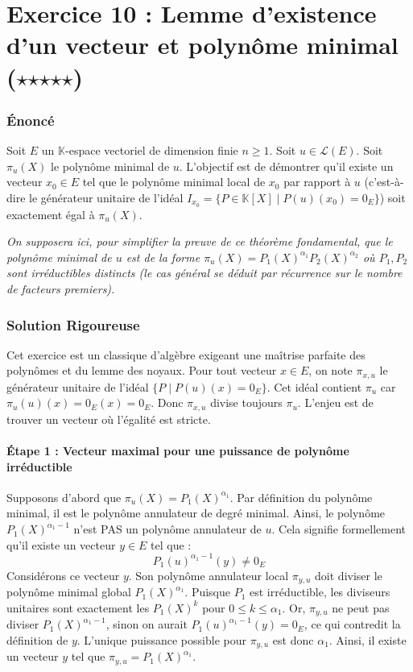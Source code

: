 \documentclass[11pt,a4paper]{article}
\begin{document}
\part{Exercice 10 : Lemme d'existence d'un vecteur et polynôme minimal ($\star$$\star$$\star$$\star$$\star$)}

\section{Énoncé}

Soit $E$ un $\mathbb{K}$-espace vectoriel de dimension finie $n \ge 1$. Soit $u \in \mathcal{L}(E)$.
Soit $\pi_u(X)$ le polynôme minimal de $u$.
L'objectif est de démontrer qu'il existe un vecteur $x_0 \in E$ tel que le polynôme minimal local de $x_0$ par rapport à $u$ (c'est-à-dire le générateur unitaire de l'idéal $I_{x_0} = \{ P \in \mathbb{K}[X] \mid P(u)(x_0) = 0_E \}$) soit exactement égal à $\pi_u(X)$.

\textit{On supposera ici, pour simplifier la preuve de ce théorème fondamental, que le polynôme minimal de $u$ est de la forme $\pi_u(X) = P_1(X)^{\alpha_1} P_2(X)^{\alpha_2}$ où $P_1, P_2$ sont irréductibles distincts (le cas général se déduit par récurrence sur le nombre de facteurs premiers).}

\section{Solution Rigoureuse}

Cet exercice est un classique d'algèbre exigeant une maîtrise parfaite des polynômes et du lemme des noyaux.
Pour tout vecteur $x \in E$, on note $\pi_{x, u}$ le générateur unitaire de l'idéal $\{ P \mid P(u)(x) = 0_E \}$. Cet idéal contient $\pi_u$ car $\pi_u(u)(x) = 0_E(x) = 0_E$. Donc $\pi_{x, u}$ divise toujours $\pi_u$. L'enjeu est de trouver un vecteur où l'égalité est stricte.

\subsection{Étape 1 : Vecteur maximal pour une puissance de polynôme irréductible}
Supposons d'abord que $\pi_u(X) = P_1(X)^{\alpha_1}$.
Par définition du polynôme minimal, il est le polynôme annulateur de degré minimal. Ainsi, le polynôme $P_1(X)^{\alpha_1 - 1}$ n'est PAS un polynôme annulateur de $u$.
Cela signifie formellement qu'il existe un vecteur $y \in E$ tel que :
$$P_1(u)^{\alpha_1 - 1}(y) \neq 0_E$$
Considérons ce vecteur $y$. Son polynôme annulateur local $\pi_{y, u}$ doit diviser le polynôme minimal global $P_1(X)^{\alpha_1}$. Puisque $P_1$ est irréductible, les diviseurs unitaires sont exactement les $P_1(X)^k$ pour $0 \le k \le \alpha_1$.
Or, $\pi_{y, u}$ ne peut pas diviser $P_1(X)^{\alpha_1 - 1}$, sinon on aurait $P_1(u)^{\alpha_1 - 1}(y) = 0_E$, ce qui contredit la définition de $y$.
L'unique puissance possible pour $\pi_{y, u}$ est donc $\alpha_1$.
Ainsi, il existe un vecteur $y$ tel que $\pi_{y, u} = P_1(X)^{\alpha_1}$.
\end{document}
